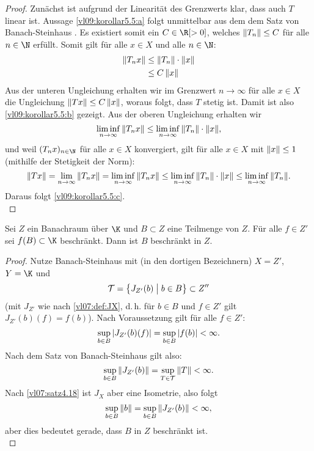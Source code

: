 \begin{proof}
    Zunächst ist aufgrund der Linearität des Grenzwerts klar, dass auch $T$
    linear ist.
    Aussage \ref{vl09:korollar5.5:a} folgt unmittelbar aus dem dem Satz von
    Banach-Steinhaus .
    Es existiert somit ein $C\in\R[>0]$, welches $\lVert T_n\rVert\leq C$ für alle
    $n\in\N$ erfüllt. Somit gilt für alle $x\in X$ und alle $n\in\N$:
    \begin{align*}
        \lVert T_n x\rVert 
        &\leq \lVert T_n\rVert \cdot \lVert x\rVert 
        \\
        &\leq C\,\lVert x\rVert  
    \end{align*}
    Aus der unteren Ungleichung erhalten wir im Grenzwert $n\to\infty$ für alle 
    $x\in X$ die Ungleichung $\lVert Tx\rVert\leq C\,\lVert x\rVert$, woraus folgt, dass $T$
    stetig ist. Damit ist also \ref{vl09:korollar5.5:b} gezeigt.
    Aus der oberen Ungleichung erhalten wir
    \[ \liminf_{n\to\infty} \, \lVert T_n x\rVert 
        \leq \liminf_{n\to\infty} \, \lVert T_n\rVert \cdot \lVert x\rVert
    , \]
    und weil $(T_n x)_{n\in\N}$ für alle $x\in X$ konvergiert, gilt für alle
    $x\in X$ mit $\lVert x\rVert\leq1$ (mithilfe der Stetigkeit der Norm):
    \[ \lVert Tx\rVert = \lim_{n\to\infty} \,\lVert T_n x\rVert
        = \liminf_{n\to\infty} \, \lVert T_n x\rVert 
        \leq \liminf_{n\to\infty} \, \lVert T_n\rVert \cdot \lVert x\rVert
        \leq \liminf_{n\to\infty} \, \lVert T_n\rVert
    . \]
    Daraus folgt \ref{vl09:korollar5.5:c}.
    \\
\end{proof}

\begin{thKorollar} \label{vl09:korollar5.6}
    Sei $Z$ ein Banachraum über $\K$ und $B\subset Z$ eine Teilmenge von $Z$.
    Für alle $f\in Z'$ sei $f(B)\subset\K$ beschränkt. Dann ist $B$ beschränkt
    in $Z$.
\end{thKorollar}

\begin{proof}
    Nutze Banach-Steinhaus 
    mit (in den dortigen Bezeichnern) $X=Z'$, $Y=\K$ und
    \[ \mathcal T = \bigl\{ J_{Z'}(b) \;\big\vert\; b\in B \bigr\} \subset Z'' \]
    (mit $J_{Z'}$ wie nach \cref{vl07:def:JX}, d.\,h. für $b\in B$ und $f\in Z'$
    gilt $J_{Z'}(b)(f) = f(b)$).
    Nach Voraussetzung gilt für alle $f\in Z'$:
    \[ \sup_{b\in B} \, \lvert J_{Z'}(b)(f)\rvert 
        = \sup_{b\in B} \, \lvert f(b)\rvert  < \infty  
    . \]
    Nach dem Satz von Banach-Steinhaus gilt also:
    \[ \sup_{b\in B} \, \lVert J_{Z'}(b)\rVert 
        = \sup_{T\in\mathcal T} \, \lVert T\rVert < \infty
    . \]
    Nach \cref{vl07:satz4.18} ist $J_X$ aber eine Isometrie, also folgt
    \[ \sup_{b\in B} \, \lVert b\rVert = \sup_{b\in B} \, \lVert J_{Z'}(b)\rVert
        < \infty
    , \]
    aber dies bedeutet gerade, dass $B$ in $Z$ beschränkt ist.
    \\
\end{proof}

